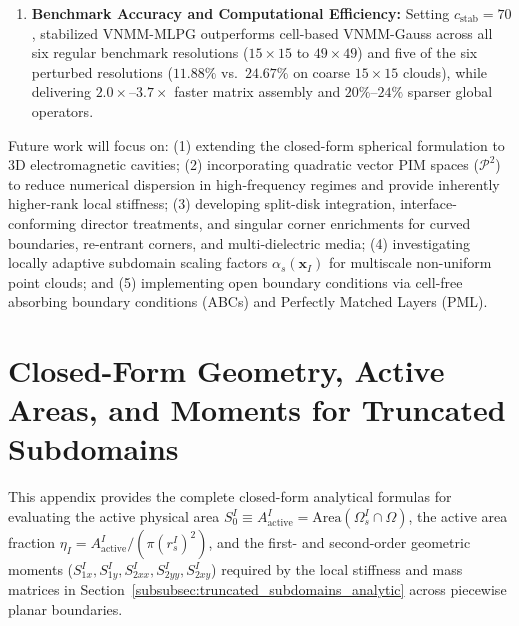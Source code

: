 \documentclass[VANCOUVER,Times1COL]{WileyNJD-v5}
\begin{document}
\begin{enumerate}
    \item \textbf{Benchmark Accuracy and Computational Efficiency:} Setting $c_{\mathrm{stab}} = 70$, stabilized VNMM-MLPG outperforms cell-based VNMM-Gauss across all six regular benchmark resolutions ($15\times 15$ to $49\times 49$) and five of the six perturbed resolutions ($11.88\%$ vs.\ $24.67\%$ on coarse $15\times 15$ clouds), while delivering $2.0\times\text{--}3.7\times$ faster matrix assembly and $20\%\text{--}24\%$ sparser global operators.
\end{enumerate}

Future work will focus on: (1) extending the closed-form spherical formulation to 3D electromagnetic cavities; (2) incorporating quadratic vector PIM spaces ($\mathcal{P}^2$) to reduce numerical dispersion in high-frequency regimes and provide inherently higher-rank local stiffness; (3) developing split-disk integration, interface-conforming director treatments, and singular corner enrichments for curved boundaries, re-entrant corners, and multi-dielectric media; (4) investigating locally adaptive subdomain scaling factors $\alpha_s(\mathbf{x}_I)$ for multiscale non-uniform point clouds; and (5) implementing open boundary conditions via cell-free absorbing boundary conditions (ABCs) and Perfectly Matched Layers (PML).

\appendix
\section{Closed-Form Geometry, Active Areas, and Moments for Truncated Subdomains}
\label{app:truncated_geometry}

This appendix provides the complete closed-form analytical formulas for evaluating the active physical area $S_0^I \equiv A_{\mathrm{active}}^I = \mathrm{Area}(\Omega_s^I \cap \Omega)$, the active area fraction $\eta_I = A_{\mathrm{active}}^I / (\pi (r_s^I)^2)$, and the first- and second-order geometric moments ($S_{1x}^I, S_{1y}^I, S_{2xx}^I, S_{2yy}^I, S_{2xy}^I$) required by the local stiffness and mass matrices in Section~\ref{subsubsec:truncated_subdomains_analytic} across piecewise planar boundaries.
\end{document}
